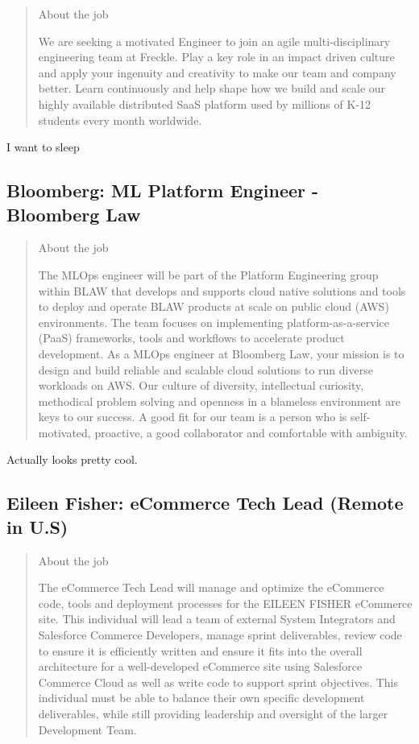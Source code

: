 \documentclass[
	letterpaper, %
	12pt, %
]{CSSullivanBusinessReport}
\begin{document}
\begin{quote}
	About the job
	
	We are seeking a motivated Engineer to join an agile multi-disciplinary engineering team at Freckle. Play a key role in an impact driven culture and apply your ingenuity and creativity to make our team and company better. Learn continuously and help shape how we build and scale our highly available distributed SaaS platform used by millions of K-12 students every month worldwide.

\end{quote}

I want to sleep



\subsection[Bloomberg]{Bloomberg: ML Platform Engineer - Bloomberg Law}

\begin{quote}
	About the job
	
	The MLOps engineer will be part of the Platform Engineering group within BLAW that develops and supports cloud native solutions and tools to deploy and operate BLAW products at scale on public cloud (AWS) environments. The team focuses on implementing platform-as-a-service (PaaS) frameworks, tools and workflows to accelerate product development. As a MLOps engineer at Bloomberg Law, your mission is to design and build reliable and scalable cloud solutions to run diverse workloads on AWS. Our culture of diversity, intellectual curiosity, methodical problem solving and openness in a blameless environment are keys to our success. A good fit for our team is a person who is self-motivated, proactive, a good collaborator and comfortable with ambiguity. 

\end{quote}

Actually looks pretty cool.


\subsection[Eileen Fisher]{Eileen Fisher: eCommerce Tech Lead (Remote in U.S)}

\begin{quote}
	About the job
	
	The eCommerce Tech Lead will manage and optimize the eCommerce code, tools and deployment processes for the EILEEN FISHER eCommerce site. This individual will lead a team of external System Integrators and Salesforce Commerce Developers, manage sprint deliverables, review code to ensure it is efficiently written and ensure it fits into the overall architecture for a well-developed eCommerce site using Salesforce Commerce Cloud as well as write code to support sprint objectives. This individual must be able to balance their own specific development deliverables, while still providing leadership and oversight of the larger Development Team.

\end{quote}
\end{document}
